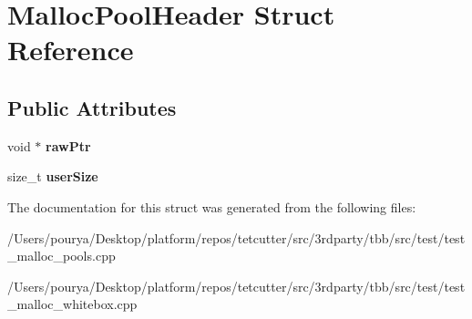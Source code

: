 \hypertarget{structMallocPoolHeader}{}\section{Malloc\+Pool\+Header Struct Reference}
\label{structMallocPoolHeader}
\subsection*{Public Attributes}
\begin{DoxyCompactItemize}
\item 
\hypertarget{structMallocPoolHeader_a16ec32c808f5e2bb8b13b5d070e71c9f}{}void $\ast$ {\bfseries raw\+Ptr}\label{structMallocPoolHeader_a16ec32c808f5e2bb8b13b5d070e71c9f}

\item 
\hypertarget{structMallocPoolHeader_a42df2be3940640ce75e08d0d1fda7e0b}{}size\+\_\+t {\bfseries user\+Size}\label{structMallocPoolHeader_a42df2be3940640ce75e08d0d1fda7e0b}

\end{DoxyCompactItemize}


The documentation for this struct was generated from the following files\+:\begin{DoxyCompactItemize}
\item 
/\+Users/pourya/\+Desktop/platform/repos/tetcutter/src/3rdparty/tbb/src/test/test\+\_\+malloc\+\_\+pools.\+cpp\item 
/\+Users/pourya/\+Desktop/platform/repos/tetcutter/src/3rdparty/tbb/src/test/test\+\_\+malloc\+\_\+whitebox.\+cpp\end{DoxyCompactItemize}
